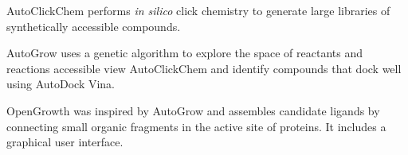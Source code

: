 AutoClickChem \cite{Durrant_2012} performs \textit{in silico} click chemistry to generate large libraries of synthetically accessible compounds.

AutoGrow \cite{Durrant_2013} uses a genetic algorithm to explore the space of reactants and reactions accessible view AutoClickChem and identify compounds that dock well using AutoDock Vina.

OpenGrowth  \cite{Ch_ron_2015}  was inspired by AutoGrow and assembles candidate ligands by connecting small organic fragments in the active site of proteins.  It includes a graphical user interface.
